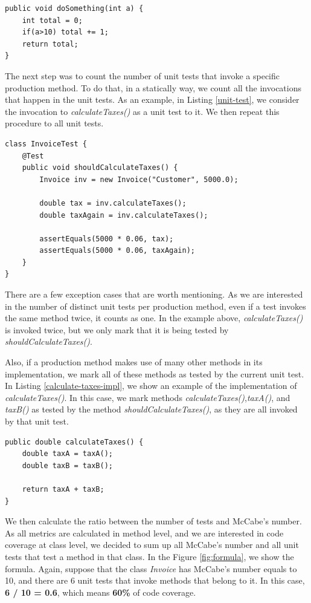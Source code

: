 \documentclass{sig-alternate}
\begin{document}
\begin{lstlisting}
public void doSomething(int a) {
	int total = 0;
	if(a>10) total += 1;
	return total;
}
\end{lstlisting}

The next step was to count the number of unit tests that invoke a specific production method. To do that,
in a statically way, we count all the invocations that happen in the unit tests. As an example, in Listing
\ref{unit-test}, we consider the invocation to \textit{calculateTaxes()} as a unit test to it.
We then repeat this procedure to all unit tests.

\begin{lstlisting}
class InvoiceTest {
	@Test
	public void shouldCalculateTaxes() {
		Invoice inv = new Invoice("Customer", 5000.0);

		double tax = inv.calculateTaxes();
		double taxAgain = inv.calculateTaxes();
		
		assertEquals(5000 * 0.06, tax);
		assertEquals(5000 * 0.06, taxAgain);
	}
}
\end{lstlisting}

There are a few exception cases that are worth mentioning. 
As we are
interested in the number of distinct unit tests per production method, 
even if a test invokes the same method twice, it
counts as one. In the example above, \textit{calculateTaxes()} is invoked 
twice, but we only mark that it is being
tested by \textit{shouldCalculateTaxes()}.

Also, if a production method makes use of many other methods in its implementation,
we mark all of these methods as tested by the current unit test. In Listing \ref{calculate-taxes-impl},
we show an example of the implementation of \textit{calculateTaxes()}. In this case, we mark
methods \textit{calculateTaxes()},\textit{taxA()}, and \textit{taxB()} as tested by the 
method \textit{shouldCalculateTaxes()}, as they are all invoked by that unit test.

\begin{lstlisting}
public double calculateTaxes() {
	double taxA = taxA();
	double taxB = taxB();
	
	return taxA + taxB;
}
\end{lstlisting}

We then calculate the ratio between the number of tests and 
McCabe's number. As all metrics are calculated in method level, and we are
interested in code coverage at class level, we decided to sum up all McCabe's number and
all unit tests that test a method in that class.
In the Figure \ref{fig:formula}, we show the formula.
Again, suppose that the class \textit{Invoice} has McCabe's number equals to 10, 
and there are 6 unit tests
that invoke methods that belong to it.  
In this case, \textbf{6 / 10 = 0.6}, which means \textbf{60\%} of code coverage.
\end{document}
